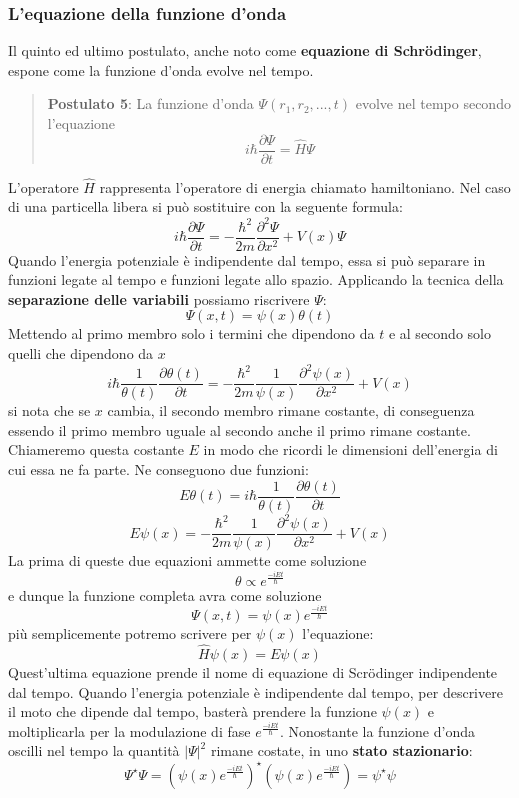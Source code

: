 \subsubsection{L'equazione della funzione d'onda}
Il quinto ed ultimo postulato, anche noto come \textbf{equazione di Schr\"odinger}, espone come la funzione d'onda evolve nel tempo.
\begin{quote}
  \textbf{Postulato 5}: La funzione d'onda $\Psi(r_1, r_2, ..., t)$ evolve nel tempo secondo l'equazione
  $$i\hbar \frac{\partial \Psi}{\partial t} = \hat{H} \Psi$$
\end{quote}
L'operatore $\hat{H}$ rappresenta l'operatore di energia chiamato hamiltoniano. Nel caso di una particella libera si può sostituire con la seguente formula:
$$i \hbar \frac{\partial \Psi}{\partial t} = - \frac{\hbar^2}{2 m} \frac{\partial^2 \Psi}{\partial x^2} + V(x) \Psi$$
Quando l'energia potenziale è indipendente dal tempo, essa si può separare in funzioni legate al tempo e funzioni legate allo spazio. Applicando la tecnica della \textbf{separazione delle variabili} possiamo riscrivere $\Psi$:
$$\Psi(x, t) = \psi(x) \theta(t)$$
Mettendo al primo membro solo i termini che dipendono da $t$ e al secondo solo quelli che dipendono da $x$
$$i \hbar \frac{1}{\theta(t)} \frac{\partial \theta(t)}{\partial t} = - \frac{\hbar^2}{2 m} \frac{1}{\psi(x)} \frac{\partial^2 \psi(x)}{\partial x^2} + V(x)$$
si nota che se $x$ cambia, il secondo membro rimane costante, di conseguenza essendo il primo membro uguale al secondo anche il primo rimane costante. Chiameremo questa costante $E$ in modo che ricordi le dimensioni dell'energia di cui essa ne fa parte. Ne conseguono due funzioni:
$$E \theta(t) = i \hbar \frac{1}{\theta(t)} \frac{\partial \theta(t)}{\partial t}$$
$$E \psi(x) = - \frac{\hbar^2}{2 m} \frac{1}{\psi(x)} \frac{\partial^2 \psi(x)}{\partial x^2} + V(x)$$
La prima di queste due equazioni ammette come soluzione
$$\theta \propto e^{\frac{-i E t}{\hbar}}$$
e dunque la funzione completa avra come soluzione
$$\Psi(x, t) = \psi(x) e^{\frac{-i E t}{\hbar}}$$
più semplicemente potremo scrivere per $\psi(x)$ l'equazione:
$$\hat{H} \psi(x) = E \psi(x)$$
Quest'ultima equazione prende il nome di equazione di Scr\"odinger indipendente dal tempo.
Quando l'energia potenziale è indipendente dal tempo, per descrivere il moto che dipende dal tempo, basterà prendere la funzione $\psi(x)$ e moltiplicarla per la modulazione di fase $e^{\frac{-i E t}{\hbar}}$. Nonostante la funzione d'onda oscilli nel tempo la quantità ${\left|\Psi\right|}^2$ rimane costate, in uno \textbf{stato stazionario}:
$$\Psi^{\star} \Psi = {\left(\psi(x) e^{\frac{-i E t}{\hbar}}\right)}^{\star} \left(\psi(x) e^{\frac{-i E t}{\hbar}}\right) = \psi^{\star} \psi$$
